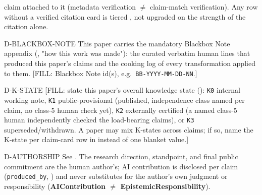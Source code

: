 \begin{disclaimers}
    claim attached to it (metadata verification $\neq$ claim-match
    verification). Any row without a verified citation card is tiered
    \OpenTier{}, not upgraded on the strength of the citation alone.
  \item[D-BLACKBOX-NOTE] This paper carries the mandatory Blackbox Note
    appendix (, "how this work was made"): the curated
    verbatim human lines that produced this paper's claims and the cooking
    log of every transformation applied to them. [FILL: Blackbox Note id(s),
    e.g.\ \texttt{BB-YYYY-MM-DD-NN}.]
  \item[D-K-STATE] [FILL: state this paper's overall knowledge state
    (\Cref{sec:kstate}): \texttt{K0} internal working note, \texttt{K1}
    public-provisional (published, independence class named per claim, no
    class-5 human check yet), \texttt{K2} externally certified (a named
    class-5 human independently checked the load-bearing claims), or
    \texttt{K3} superseded/withdrawn. A paper may mix K-states across claims;
    if so, name the K-state per claim-card row in \Cref{tab:claim-matrix}
    instead of one blanket value.]
  \item[D-AUTHORSHIP] See . The research direction,
    standpoint, and final public commitment are the human author's; AI
    contribution is disclosed per claim (\texttt{produced\_by},
    ) and never substitutes for the author's own
    judgment or responsibility (\textbf{AIContribution $\neq$
    EpistemicResponsibility}).
\end{disclaimers}
